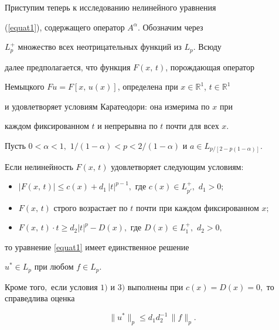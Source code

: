 \smallskip



Приступим теперь к исследованию нелинейного уравнения

(\ref{equat1}), содержащего оператор $A^\alpha$. Обозначим через

$L_p^+$ множество всех неотрицательных функций из $L_p$. Всюду

далее предполагается, что функция $F(x,\,t)$, порождающая оператор

Немыцкого $Fu=F[x,\,u(x)]$, определена при $x\in \mathbb R^1$, $t\in \mathbb R^1$

и удовлетворяет условиям Каратеодори: она измерима по $x$ при

каждом фиксированном $t$ и непрерывна по $t$ почти для всех $x$.





\begin{theorem}[1]Пусть $0<\alpha<1,$ $1/(1-\alpha)<p<2/(1-\alpha)$ и $a\in

L_{p/[2-p(1-\alpha)]}.$

Если нелинейность $F(x,\,t)$ удовлетворяет следующим условиям{\/\rm:}



\begin{itemize}

\item[{\rm 1)}] $|F(x,\,t)|\leq c(x)+d_1\,|t|^{p-1},$ где $c(x)\in L_{p'}^+,$ $d_1>0;$



\item[{\rm 2)}] $F(x,\,t)$ строго возрастает по $t$ почти при каждом фиксированном $x;$



\item[{\rm 3)}] $F(x,\,t)\cdot t\geq d_2 |t|^p-D(x),$ где $D(x)\in L_1^+,$ $d_2>0,$

\end{itemize}

то уравнение \eqref{equat1} имеет единственное решение

$u^*\in L_p$ при любом $f\in L_p.$

Кроме того$,$ если условия $1)$ и $3)$ выполнены при $c(x)=D(x)=0,$ то справедлива оценка

\begin{equation}

\label{estim1}

\|u^*\|_p\leq d_1d_2^{-1}\,\|f\|_p.

\end{equation}

\end{theorem}



